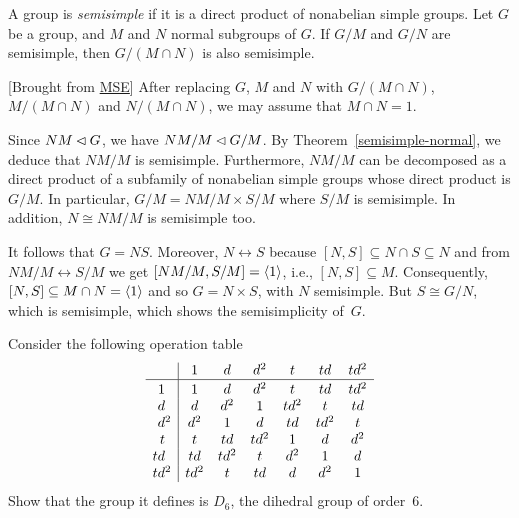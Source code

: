 \begin{exr}
    A group is \textsl{semisimple} if it is a direct product of nonabelian simple groups. Let\/ $G$ be a group, and\/ $M$ and\/ $N$ normal subgroups of\/ $G$. If\/ $G/M$ and\/ $G/N$ are semisimple, then\/ $G/(M \cap N)$ is also semisimple.
\end{exr}

\begin{solution} {[Brought from \href{https://math.stackexchange.com/a/1217299/269050}{MSE}]} After replacing $G$, $M$ and $N$ with $G/(M\cap N)$, $M/(M\cap N)$ and $N/(M\cap N)$, we may assume that $M\cap N=1$.

Since $NM\lhd G$, we have $NM/M\lhd G/M$. By Theorem~\ref{semisimple-normal}, we deduce that $NM/M$ is semisimple. Furthermore, $NM/M$ can be decomposed as a direct product of a subfamily of nonabelian simple groups whose direct product is $G/M$. In particular, $G/M=NM/M\times S/M$ where $S/M$ is semisimple. In addition, $N\cong NM/M$ is semisimple too.

It follows that $G=NS$. Moreover, $N\leftrightarrow S$ because $[N,S]\subseteq N\cap S\subseteq N$ and from $NM/M\leftrightarrow S/M$ we get $[NM/M,S/M]=\langle1\rangle$, i.e., $[N,S]\subseteq M$. Consequently, $[N,S]\subseteq M\cap N=\langle1\rangle$ and so $G=N\times S$, with $N$ semisimple. But $S\cong G/N$, which is semisimple, which shows the semisimplicity of~$G$.  \end{solution}

\begin{exr}
    Consider the following operation table
    {\small
    $$
        \begin{array}{r|ccccccc}
                & 1 & d & d^2 & t & td & td^2 \\
            \hline
            \vphantom{{1^{1{^1}}}}
            1\phantom{{}^2} & 1 & d & d^2 & t & td & td^2 \\
            d\phantom{{}^2} & d & d^2 & 1 & td^2 & t & td \\
            d^2 & d^2 & 1 & d & td & td^2 & t \\
            t\phantom{{}^2} & t & td & td^2 & 1 & d & d^2 \\
            td\phantom{{}^2} & td & td^2 & t & d^2 & 1 & d \\
            td^2 & td^2 & t & td & d & d^2 & 1 \\
    \end{array}
    $$
    }
    Show that the group it defines is $D_6$, the dihedral group of order\/~$6$.
\end{exr}

